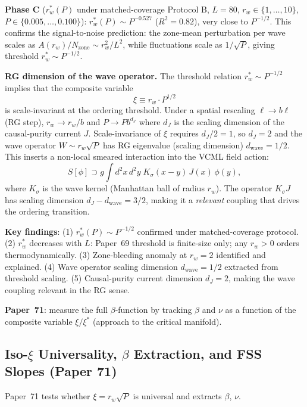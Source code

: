 \documentclass[11pt]{article}
\begin{document}
\textbf{Phase C} ($r_w^*(P)$ under matched-coverage Protocol B, $L=80$,
$r_w\in\{1,\ldots,10\}$, $P\in\{0.005,\ldots,0.100\}$):
$r_w^*(P)\sim P^{-0.527}$ ($R^2=0.82$), very close to $P^{-1/2}$.
This confirms the signal-to-noise prediction: the zone-mean perturbation per wave
scales as $A(r_w)/N_\mathrm{zone}\sim r_w^2/L^2$, while fluctuations scale as $1/\sqrt{P}$,
giving threshold $r_w^*\sim P^{-1/2}$.

\textbf{RG dimension of the wave operator.}
The threshold relation $r_w^*\sim P^{-1/2}$ implies that the composite variable
\begin{equation}
  \xi \equiv r_w \cdot P^{1/2}
\end{equation}
is scale-invariant at the ordering threshold.
Under a spatial rescaling $\ell\to b\ell$ (RG step), $r_w\to r_w/b$ and $P\to Pb^{d_J}$
where $d_J$ is the scaling dimension of the causal-purity current $J$.
Scale-invariance of $\xi$ requires $d_J/2 = 1$, so $d_J=2$ and the wave operator
$W\sim r_w\sqrt{P}$ has RG eigenvalue (scaling dimension) $d_\mathrm{wave}=1/2$.
This inserts a non-local smeared interaction into the VCML field action:
\begin{equation}
  S[\phi] \supset g\int d^2x\,d^2y\; K_\sigma(x-y)\,J(x)\,\phi(y),
\end{equation}
where $K_\sigma$ is the wave kernel (Manhattan ball of radius $r_w$).
The operator $K_\sigma J$ has scaling dimension $d_J-d_\mathrm{wave}=3/2$,
making it a \emph{relevant} coupling that drives the ordering transition.

\textbf{Key findings}: (1) $r_w^*(P)\sim P^{-1/2}$ confirmed under matched-coverage protocol.
(2) $r_w^*$ decreases with $L$: Paper~69 threshold is finite-size only; any $r_w>0$ orders
thermodynamically. (3) Zone-bleeding anomaly at $r_w=2$ identified and explained.
(4) Wave operator scaling dimension $d_\mathrm{wave}=1/2$ extracted from threshold scaling.
(5) Causal-purity current dimension $d_J=2$, making the wave coupling relevant in the RG sense.

\textbf{Paper~71}: measure the full $\beta$-function by tracking $\beta$ and $\nu$
as a function of the composite variable $\xi/\xi^*$ (approach to the critical manifold).

\subsection{Iso-$\xi$ Universality, $\beta$ Extraction, and FSS Slopes (Paper 71)}

Paper~71 tests whether $\xi=r_w\sqrt{P}$ is universal and extracts $\beta$, $\nu$.
\end{document}
